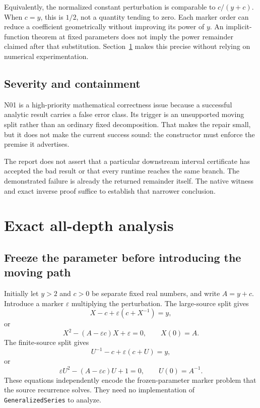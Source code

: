 \documentclass[11pt,letterpaper]{article}
\theoremstyle{remark}\newtheorem{remark}[theorem]{Remark}
\newcommand{\code}[1]{\texttt{#1}}
\newcommand{\eps}{\varepsilon}
\begin{document}
Equivalently, the normalized constant perturbation is comparable to
$c/(y+c)$. When $c=y$, this is $1/2$, not a quantity tending to zero. Each marker
order can reduce a coefficient geometrically without improving its power of
$y$. An implicit-function theorem at fixed parameters does not imply the
power remainder claimed after that substitution. Section~\ref{sec:alldepth}
makes this precise without relying on numerical experimentation.

\subsection{Severity and containment}
N01 is a high-priority mathematical correctness issue because a successful
analytic result carries a false error class. Its trigger is an unsupported
moving split rather than an ordinary fixed decomposition. That makes the
repair small, but it does not make the current success sound: the constructor
must enforce the premise it advertises.

The report does not assert that a particular downstream interval certificate
has accepted the bad result or that every runtime reaches the same branch.
The demonstrated failure is already the returned remainder itself. The native
witness and exact inverse proof suffice to establish that narrower conclusion.

\section{Exact all-depth analysis}\label{sec:alldepth}
\subsection{Freeze the parameter before introducing the moving path}
Initially let $y>2$ and $c>0$ be separate fixed real numbers, and write
$A=y+c$. Introduce a marker $\eps$ multiplying the perturbation. The large-source
split gives
\[
 X-c+\eps(c+X^{-1})=y,
\]
or
\begin{equation}\label{eq:marklarge}
 X^2-(A-\eps c)X+\eps=0,\qquad X(0)=A.
\end{equation}
The finite-source split gives
\[
 U^{-1}-c+\eps(c+U)=y,
\]
or
\begin{equation}\label{eq:marksmall}
 \eps U^2-(A-\eps c)U+1=0,\qquad U(0)=A^{-1}.
\end{equation}
These equations independently encode the frozen-parameter marker problem
that the source recurrence solves. They need no implementation of
\code{GeneralizedSeries} to analyze.
\end{document}
